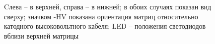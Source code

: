 \begin{figure}[ht]	
	\caption[Расположение фотоумножителей в матрице считывания.] {Cлева – в верхней, справа – в нижней; в обоих случаях показан вид сверху; значком -HV показана ориентация матриц относительно катодного высоковольтного кабеля; LED – положения светодиодов вблизи верхней матрицы}
	\label{img:pmtscheme}
\end{figure}

